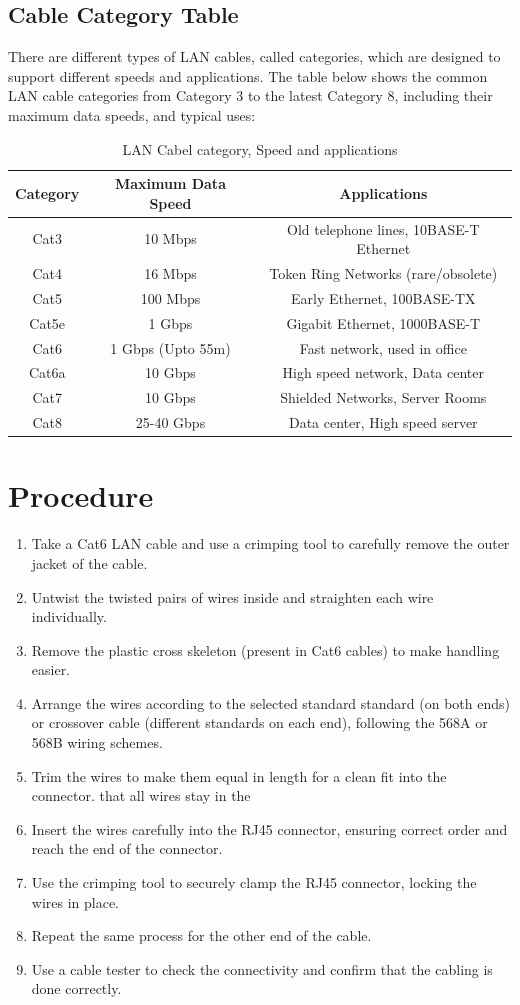 \documentclass[a4paper,12pt]{report}
\begin{document}
\subsection*{Cable Category Table}
There are different types of LAN cables, called categories, which are designed to support different speeds and applications. The table below shows the common LAN cable categories from Category 3 to the latest Category 8, including their maximum data speeds, and typical uses: 
\begin{table}[h]
\centering
\begin{tabular}{|c|c|c|}
    \hline
     Category & Maximum Data Speed & Applications\\ \hline
     Cat3 & 10 Mbps & Old telephone lines, 10BASE-T Ethernet \\
     Cat4 & 16 Mbps & Token Ring Networks (rare/obsolete) \\
     Cat5 & 100 Mbps & Early Ethernet, 100BASE-TX \\
     Cat5e & 1 Gbps & Gigabit Ethernet, 1000BASE-T \\
     Cat6 & 1 Gbps (Upto 55m) & Fast network, used in office \\
     Cat6a & 10 Gbps & High speed network, Data center \\
     Cat7 & 10 Gbps & Shielded Networks, Server Rooms \\
     Cat8 & 25-40 Gbps & Data center, High speed server \\ \hline
\end{tabular}
\caption{LAN Cabel category, Speed and applications}
\end{table}
\section*{Procedure}
\begin{enumerate}
    \item Take a Cat6 LAN cable and use a crimping tool to carefully remove the outer jacket of the cable.
    \item Untwist the twisted pairs of wires inside and straighten each wire individually.
    \item Remove the plastic cross skeleton (present in Cat6 cables) to make handling easier.
    \item Arrange the wires according to the selected standard standard (on both ends) or crossover cable (different standards on each end), following the 568A or 568B wiring schemes.
    \item Trim the wires to make them equal in length for a clean fit into the connector. that all wires stay in the
    \item Insert the wires carefully into the RJ45 connector, ensuring correct order and reach the end of the connector.
    \item Use the crimping tool to securely clamp the RJ45 connector, locking the wires in place.
    \item Repeat the same process for the other end of the cable.
    \item Use a cable tester to check the connectivity and confirm that the cabling is done correctly.
\end{enumerate}
\end{document}
